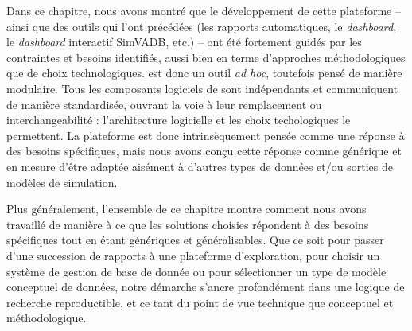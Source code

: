 Dans ce chapitre, nous avons montré que le développement de cette plateforme -- ainsi que des outils qui l'ont précédées (les rapports automatiques, le \textit{dashboard}, le \textit{dashboard} interactif SimVADB, etc.) -- ont été fortement guidés par les contraintes et besoins identifiés, aussi bien en terme d'approches méthodologiques que de choix technologiques.
\simedb{} est donc un outil \textit{ad hoc}, toutefois pensé de manière modulaire.
Tous les composants logiciels de \simedb{} sont indépendants et communiquent de manière standardisée, ouvrant la voie à leur remplacement ou \og interchangeabilité\fg{} : l'architecture logicielle et les choix techologiques le permettent.
La plateforme \simedb{} est donc intrinsèquement pensée comme une réponse à des besoins spécifiques, mais nous avons conçu cette réponse comme générique et en mesure d'être adaptée aisément à d'autres types de données et/ou sorties de modèles de simulation.

Plus généralement, l'ensemble de ce chapitre montre comment nous avons travaillé de manière à ce que les solutions choisies répondent à des besoins spécifiques tout en étant génériques et généralisables.
Que ce soit pour passer d'une succession de rapports à une plateforme d'exploration, pour choisir un système de gestion de base de donnée ou pour sélectionner un type de modèle conceptuel de données, notre démarche s'ancre profondément dans une logique de recherche reproductible, et ce tant du point de vue technique que conceptuel et méthodologique.

